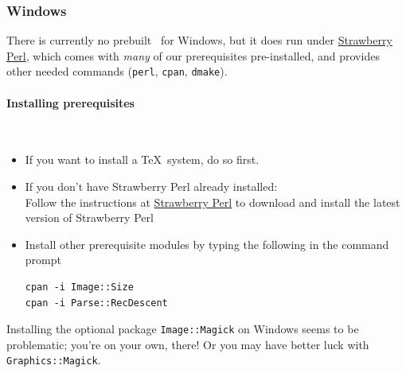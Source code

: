 \documentclass{article}
\begin{document}
\subsubsection{Windows}\label{install.windows}
There is currently no prebuilt \LaTeXML\ for Windows,
but it does run under \href{http://strawberryperl.com}{Strawberry Perl},
which comes with \emph{many} of our prerequisites pre-installed,
and provides other needed commands (\texttt{perl}, \texttt{cpan}, \texttt{dmake}).

\paragraph{Installing prerequisites}\label{install.windows.prerequisites}\\
\begin{itemize}
\item If you want to install a \TeX\ system, do so first.
\item If you don't have Strawberry Perl already installed:\\
   Follow the instructions at \href{http://strawberryperl.com}{Strawberry Perl}
   to download and install the latest version of Strawberry Perl\\
\item Install other prerequisite modules by typing the following in the command prompt
\begin{lstlisting}[style=shell]
cpan -i Image::Size
cpan -i Parse::RecDescent
\end{lstlisting}
\end{itemize}
Installing the optional package \texttt{Image::Magick} on Windows seems to be problematic;
you're on your own, there!
Or you may  have better luck with \texttt{Graphics::Magick}.
\end{document}
